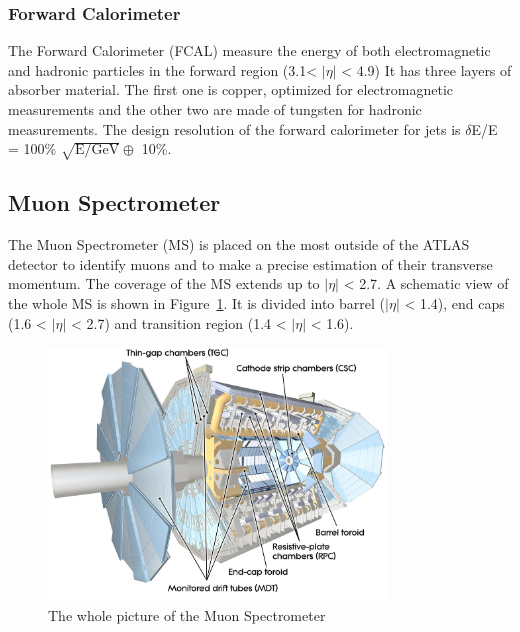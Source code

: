 \subsubsection{Forward Calorimeter}
The Forward Calorimeter (FCAL) measure the energy of both electromagnetic and hadronic particles in the forward region (3.1< $|\eta|$ < 4.9)
It has three layers of absorber material. The first one is copper, optimized for electromagnetic measurements and the other two are made of tungsten for hadronic measurements. 
The design resolution of the forward calorimeter for jets is $\delta$E/E = 100\% $\sqrt{\mathrm{E/GeV}} \oplus$ 10\%.

\subsection{Muon Spectrometer}
The Muon Spectrometer (MS) is placed on the most outside of the ATLAS detector to identify muons and to make a precise estimation of their transverse momentum.
The coverage of the MS extends up to $|\eta|$ < 2.7. A schematic view of the whole MS is shown in Figure~\ref{fig:MS}.
It is divided into  barrel ($|\eta|$ < 1.4), end caps (1.6 < $|\eta|$ < 2.7) and
transition region (1.4 < $|\eta|$ < 1.6).

\begin{figure}[tbp]
\begin{center}
 \includegraphics[width=0.8\textwidth,keepaspectratio]{figures/detector/MS}
\caption{
The whole picture of the Muon Spectrometer
}
\label{fig:MS}
\end{center}
\end{figure}

